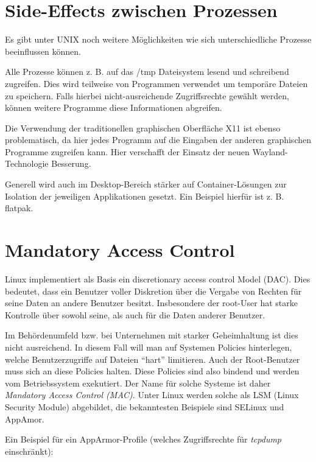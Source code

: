 \section{Side-Effects zwischen Prozessen}

Es gibt unter UNIX noch weitere Möglichkeiten wie sich unterschiedliche Prozesse beeinflussen können.

Alle Prozesse können z. B. auf das /tmp Dateisystem lesend und schreibend zugreifen. Dies wird teilweise von Programmen verwendet um temporäre Dateien zu speichern. Falls hierbei nicht-ausreichende Zugriffsrechte gewählt werden, können weitere Programme diese Informationen abgreifen.

Die Verwendung der traditionellen graphischen Oberfläche X11 ist ebenso problematisch, da hier jedes Programm auf die Eingaben der anderen graphischen Programme zugreifen kann. Hier verschafft der Einsatz der neuen Wayland-Technologie Besserung.

Generell wird auch im Desktop-Bereich stärker auf Container-Lösungen zur Isolation der jeweiligen Applikationen gesetzt. Ein Beispiel hierfür ist z. B. flatpak.

\section{Mandatory Access Control}

Linux implementiert als Basis ein discretionary access control Model (DAC). Dies bedeutet, dass ein Benutzer voller Diskretion über die Vergabe von Rechten für seine Daten an andere Benutzer besitzt. Insbesondere der root-User hat starke Kontrolle über sowohl seine, als auch für die Daten anderer Benutzer.

Im Behördenumfeld bzw. bei Unternehmen mit starker Geheimhaltung ist dies nicht ausreichend. In diesem Fall will man auf Systemen Policies hinterlegen, welche Benutzerzugriffe auf Dateien ``hart'' limitieren. Auch der Root-Benutzer muss sich an diese Policies halten. Diese Policies sind also bindend und werden vom Betriebssystem exekutiert. Der Name für solche Systeme ist daher \textit{Mandatory Access Control (MAC)}. Unter Linux werden solche als LSM (Linux Security Module) abgebildet, die bekanntesten Beispiele sind SELinux und AppAmor.

Ein Beispiel für ein AppArmor-Profile (welches Zugriffsrechte für \textit{tcpdump} einschränkt):

